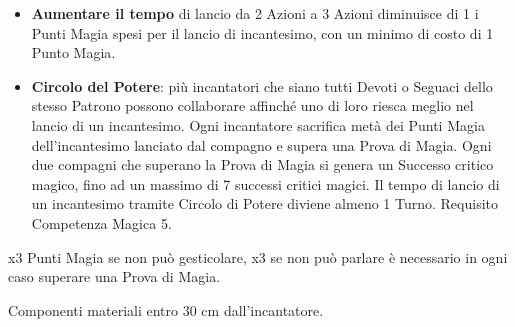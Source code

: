 \documentclass[landscape,10pt,a4paper]{article}
\begin{document}
\begin{multicols}{2}
\begin{dmbox}[title=Alterare la Magia - pagina \pageref{magiealteraremagie}]
\begin{itemize}[leftmargin=0.5cm,itemsep=-1pt,parsep=0pt]
\item \textbf{Aumentare il tempo} di lancio da 2 Azioni a 3 Azioni diminuisce di 1 i Punti Magia spesi per il lancio di incantesimo, con un minimo di costo di 1 Punto Magia.

\item \textbf{Circolo del Potere}: più incantatori che siano tutti Devoti o Seguaci dello stesso Patrono possono collaborare affinché uno di loro riesca meglio nel lancio di un incantesimo.
Ogni incantatore sacrifica metà dei Punti Magia dell'incantesimo lanciato dal compagno e supera una Prova di Magia. Ogni due compagni che superano la Prova di Magia si genera un Successo critico magico, fino ad un massimo di 7 successi critici magici. Il tempo di lancio di un incantesimo tramite Circolo di Potere diviene almeno 1 Turno. Requisito Competenza Magica 5.

\end{itemize}
\end{dmbox}

\begin{dmbox}[title=Tentare Incantesimi con impedimenti - pagina \pageref{magieconimpedimenti}]

x3 Punti Magia se non può gesticolare, x3 se non può parlare è necessario in ogni caso superare una Prova di Magia.

Componenti materiali entro 30 cm dall'incantatore.
\end{dmbox}

\end{multicols}
\end{document}
